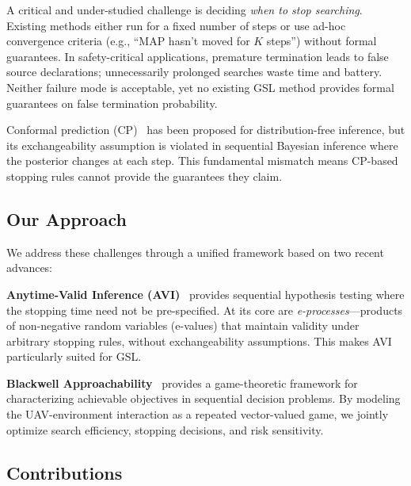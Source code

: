 A critical and under-studied challenge is deciding \emph{when to stop searching}. Existing methods either run for a fixed number of steps or use ad-hoc convergence criteria (e.g., ``MAP hasn't moved for $K$ steps'') without formal guarantees. In safety-critical applications, premature termination leads to false source declarations; unnecessarily prolonged searches waste time and battery. Neither failure mode is acceptable, yet no existing GSL method provides formal guarantees on false termination probability.

Conformal prediction (CP)~\cite{ref9} has been proposed for distribution-free inference, but its exchangeability assumption is violated in sequential Bayesian inference where the posterior changes at each step. This fundamental mismatch means CP-based stopping rules cannot provide the guarantees they claim.

\subsection{Our Approach}

We address these challenges through a unified framework based on two recent advances:

\textbf{Anytime-Valid Inference (AVI)}~\cite{ref10,ref11} provides sequential hypothesis testing where the stopping time need not be pre-specified. At its core are \emph{e-processes}---products of non-negative random variables (e-values) that maintain validity under arbitrary stopping rules, without exchangeability assumptions. This makes AVI particularly suited for GSL.

\textbf{Blackwell Approachability}~\cite{ref12,ref13} provides a game-theoretic framework for characterizing achievable objectives in sequential decision problems. By modeling the UAV-environment interaction as a repeated vector-valued game, we jointly optimize search efficiency, stopping decisions, and risk sensitivity.

\subsection{Contributions}

